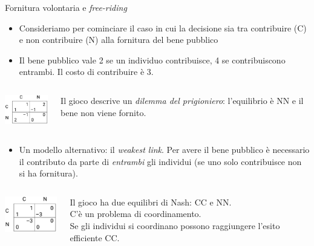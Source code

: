 \documentclass[aspectratio=64,11pt]{beamer}
\begin{document}
\begin{frame}{Fornitura volontaria e \emph{free-riding}}
\begin{itemize}
\item Consideriamo per cominciare il caso in cui la decisione sia tra contribuire (C) e non contribuire (N) alla fornitura del bene pubblico
\item Il bene pubblico vale 2 se un individuo contribuisce, 4 se contribuiscono entrambi. Il costo di contribuire è 3.
\end{itemize}
\vspace{-6pt}
\begin{columns}
\begin{column}{.4\columnwidth}
\begin{center}
\includegraphics[width=2.5cm]{./figure/gioco-bene-pubblico-dilemma-prigioniero.png}
\end{center}
\vspace{0pt}
\end{column}
\begin{column}{.6\columnwidth}
  Il gioco descrive un \emph{dilemma del prigioniero}: l'equilibrio è NN e il bene non viene fornito.
\end{column}
\end{columns}
\begin{itemize}
\item Un modello alternativo: il \emph{weakest link}.  Per avere il bene pubblico è necessario il contributo da parte di \emph{entrambi} gli individui (se uno solo contribuisce non si ha fornitura).
\end{itemize}
\vspace{-6pt}
\begin{columns}
\begin{column}{.4\columnwidth}
\begin{center}
\includegraphics[width=2.5cm]{./figure/gioco-bene-pubblico-coordinamento.png}
\end{center}
\smallskip
\end{column}
\begin{column}{.6\columnwidth}
  Il gioco ha due equilibri di Nash: CC e NN.\\[0pt]
  C'è un problema di coordinamento.\\[0pt]
  Se gli individui si coordinano possono raggiungere l'esito efficiente CC.
\end{column}
\end{columns}
\end{frame}
\end{document}
